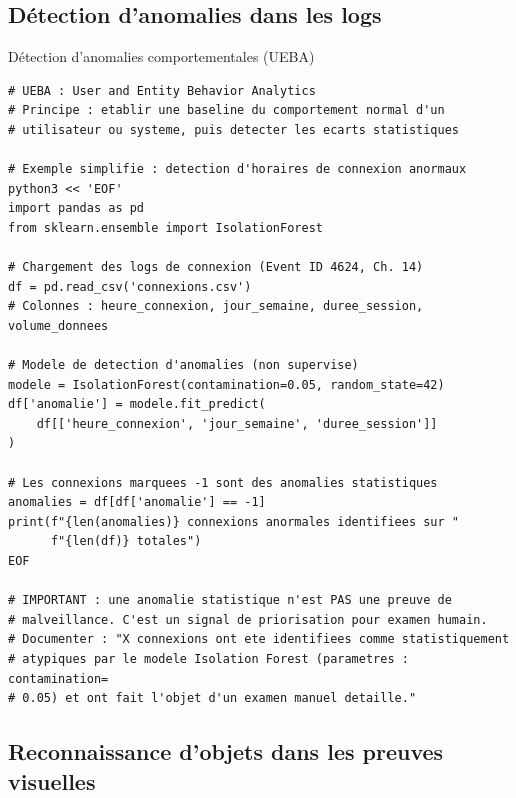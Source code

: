 \subsection{Détection d'anomalies dans les logs}

\begin{boxoutils}{Détection d'anomalies comportementales (UEBA)}
\begin{lstlisting}[language=bash_forensique]
# UEBA : User and Entity Behavior Analytics
# Principe : etablir une baseline du comportement normal d'un
# utilisateur ou systeme, puis detecter les ecarts statistiques

# Exemple simplifie : detection d'horaires de connexion anormaux
python3 << 'EOF'
import pandas as pd
from sklearn.ensemble import IsolationForest

# Chargement des logs de connexion (Event ID 4624, Ch. 14)
df = pd.read_csv('connexions.csv')
# Colonnes : heure_connexion, jour_semaine, duree_session, volume_donnees

# Modele de detection d'anomalies (non supervise)
modele = IsolationForest(contamination=0.05, random_state=42)
df['anomalie'] = modele.fit_predict(
    df[['heure_connexion', 'jour_semaine', 'duree_session']]
)

# Les connexions marquees -1 sont des anomalies statistiques
anomalies = df[df['anomalie'] == -1]
print(f"{len(anomalies)} connexions anormales identifiees sur "
      f"{len(df)} totales")
EOF

# IMPORTANT : une anomalie statistique n'est PAS une preuve de
# malveillance. C'est un signal de priorisation pour examen humain.
# Documenter : "X connexions ont ete identifiees comme statistiquement
# atypiques par le modele Isolation Forest (parametres : contamination=
# 0.05) et ont fait l'objet d'un examen manuel detaille."
\end{lstlisting}
\end{boxoutils}

\subsection{Reconnaissance d'objets dans les preuves visuelles}


